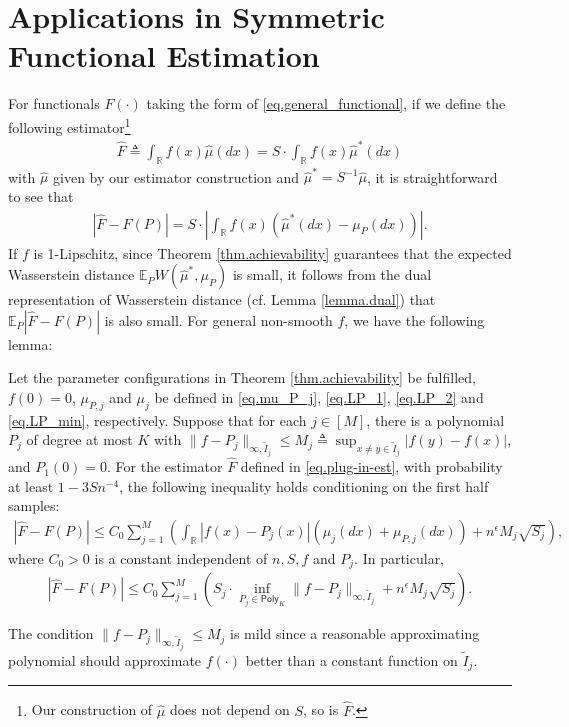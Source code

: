 \documentclass[final,12pt]{colt2018} %
\def \bE {\mathbb{E}}
\newcommand{\reals}{\mathbb{R}}
\begin{document}
\section{Applications in Symmetric Functional Estimation}\label{sec.functional}
For functionals $F(\cdot)$ taking the form of \eqref{eq.general_functional}, if we define the following estimator\footnote{Our construction of $\hat{\mu}$ does not depend on $S$, so is $\hat{F}$.}
\begin{align}\label{eq.plug-in-est}
\hat{F} \triangleq \int_{\mathbb{R}} f(x)\hat{\mu}(dx) = S\cdot\int_{\mathbb{R}} f(x)\hat{\mu}^*(dx)
\end{align}
with $\hat{\mu}$ given by our estimator construction and $\hat{\mu}^*=S^{-1}\hat{\mu}$, it is straightforward to see that
\begin{align*}
|\hat{F} - F(P)| = S\cdot \left|\int_{\mathbb{R}} f(x)(\hat{\mu}^*(dx) - \mu_P(dx))\right|.
\end{align*}
If $f$ is 1-Lipschitz, since Theorem \ref{thm.achievability} guarantees that the expected Wasserstein distance $\bE_PW(\hat{\mu}^*,\mu_P)$ is small, it follows from the dual representation of Wasserstein distance (cf. Lemma \ref{lemma.dual}) that $\bE_P|\hat{F}-F(P)|$ is also small. For general non-smooth $f$, we have the following lemma:
\begin{lemma}\label{lemma.functional}
	Let the parameter configurations in Theorem \ref{thm.achievability} be fulfilled, $f(0)=0$, $\mu_{P,j}$ and $\mu_j$ be defined in \eqref{eq.mu_P_j}, \eqref{eq.LP_1}, \eqref{eq.LP_2} and \eqref{eq.LP_min}, respectively. Suppose that for each $j\in [M]$, there is a polynomial $P_j$ of degree at most $K$ with $\|f-P_j\|_{\infty,\tilde{I}_j} \le M_j\triangleq \sup_{x\neq y\in \tilde{I}_j}|f(y)-f(x)|$, and $P_1(0)=0$. For the estimator $\hat{F}$ defined in \eqref{eq.plug-in-est}, with probability at least $1-3Sn^{-4}$, the following inequality holds conditioning on the first half samples:
	\begin{align*}
	|\hat{F}-F(P)|\le C_0\sum_{j=1}^M\left(\int_{\reals} |f(x)-P_j(x)|(\mu_j(dx)+\mu_{P,j}(dx)) + n^{\epsilon}M_j\sqrt{S_j}\right),
	\end{align*}
	where $C_0>0$ is a constant independent of $n,S,f$ and $P_j$. In particular,
	\begin{align*}
	|\hat{F}-F(P)| \le C_0\sum_{j=1}^M\left(S_j\cdot\inf_{P_j\in\mathsf{Poly}_K}\|f-P_j\|_{\infty,\tilde{I}_j} + n^{\epsilon}M_j\sqrt{S_j}\right).
	\end{align*}
\end{lemma}
\begin{remark}
	The condition $\|f-P_j\|_{\infty,\tilde{I}_j} \le M_j$ is mild since a reasonable approximating polynomial should approximate $f(\cdot)$ better than a constant function on $\tilde{I}_j$.
\end{remark}
\end{document}
